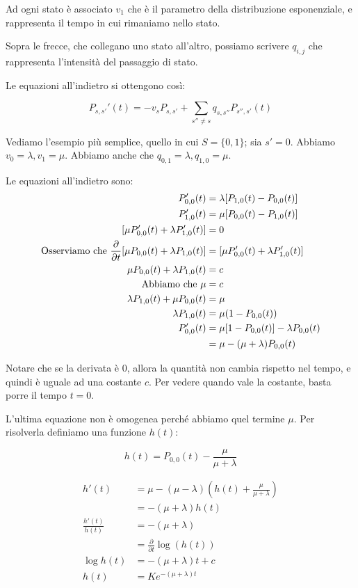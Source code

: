 \documentclass[a4paper,12pt]{book}
\begin{document}
Ad ogni stato è associato $ v_1 $ che è il parametro della distribuzione esponenziale, e rappresenta il tempo in cui rimaniamo nello stato.

Sopra le frecce, che collegano uno stato all'altro, possiamo scrivere $ q_{i,j}$ che rappresenta l'intensità del passaggio di stato.  

Le equazioni all'indietro si ottengono così:

$$ P_{s,s'}'(t) = -v_sP_{s,s'} + \sum_{s''\ne s} q_{s,s''} P_{s'',s'}(t)$$

Vediamo l'esempio più semplice, quello in cui $ S = \{0,1\} $; sia $ s' = 0 $. Abbiamo $ v_0 = \lambda, v_1 = \mu $. Abbiamo anche che $ q_{0,1} = \lambda, q_{1,0} = \mu $.

Le equazioni all'indietro sono:
\begin{align*}
	P_{0,0}'(t) & = \lambda[P_{1,0}(t) - P_{0,0}(t)] \\
	P_{1,0}'(t) & = \mu [P_{0,0}(t) - P_{1,0}(t) ] \\
	[ \mu P_{0,0}'(t) + \lambda P_{1,0}'(t) ] & = 0 \\
	\textnormal{Osserviamo che } \frac{\partial}{\partial t} [\mu P_{0,0}(t) + \lambda P_{1,0}(t)] & = [ \mu P_{0,0}'(t) + \lambda P_{1,0}'(t) ] \\
	 \mu P_{0,0}(t) + \lambda P_{1,0}(t) & = c \\ 
	 \textnormal{Abbiamo che } \mu & = c \\
	 \lambda P_{1,0}(t) + \mu P_{0,0}(t) & = \mu \\
	 \lambda P_{1,0}(t) & = \mu(1 - P_{0,0}(t)) \\
	 P_{0,0}'(t) & = \mu[1-P_{0,0}(t)] - \lambda P_{0,0}(t) \\
	 & = \mu - (\mu + \lambda) P_{0,0}(t)
	\end{align*}

Notare che se la derivata è 0, allora la quantità non cambia rispetto nel tempo, e quindi è uguale ad una costante $ c $. Per vedere quando vale la costante, basta porre il tempo $ t=0 $. 

L'ultima equazione non è omogenea perché abbiamo quel termine $\mu$. Per risolverla definiamo una funzione $ h(t) $:

$$ h(t) = P_{0,0}(t) - \frac{\mu}{\mu + \lambda}$$

\begin{align*}
	h'(t) & = \mu - (\mu - \lambda)(h(t) + \frac{\mu}{\mu + \lambda}) \\
	& = -(\mu + \lambda)h(t) \\
	\frac{h'(t)}{h(t)} & = -(\mu + \lambda) \\
	& = \frac{\partial}{\partial t} \log(h(t)) \\
	\log h(t) & = -(\mu + \lambda)t + c \\
	h(t) & = K e^{-(\mu + \lambda)t}
\end{align*}
\end{document}

